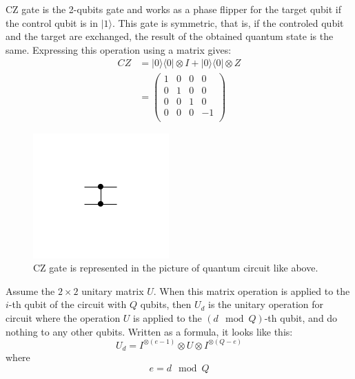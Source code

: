 \par CZ gate is the 2-qubits gate and works as a phase flipper for the target qubit if the control qubit is in $|1\rangle$. This gate is symmetric, that is, if the controled qubit and the target are exchanged, the result of the obtained quantum state is the same. Expressing this operation using a matrix gives:
$$
\begin{aligned}
CZ&=|0\rangle\langle0|\otimes I+|0\rangle\langle0|\otimes Z\\
&=\begin{pmatrix}
1 & 0 & 0 & 0\\
0 & 1 & 0 & 0\\
0 & 0 & 1 & 0\\
0 & 0 & 0 & -1\\
\end{pmatrix}
\end{aligned}$$

\begin{figure}[H]
    \centering
    \includegraphics[keepaspectratio, scale=4]{preliminary/CZ.pdf}
    \caption{CZ gate is represented in the picture of quantum circuit like above.}
    \label{fig:CZ}
\end{figure}

\par Assume the $2\times 2$ unitary matrix $U$. When this matrix operation is applied to the $i$-th qubit of the circuit with $Q$ qubits, then $U_d$ is the unitary operation for circuit where the operation $U$ is applied to the $(d \mod Q)$-th qubit, and do nothing to any other qubits. Written as a formula, it looks like this:
$$U_d = I^{\otimes (e-1)}\otimes U\otimes I^{\otimes (Q-e)}$$
where
$$e = d\mod Q$$